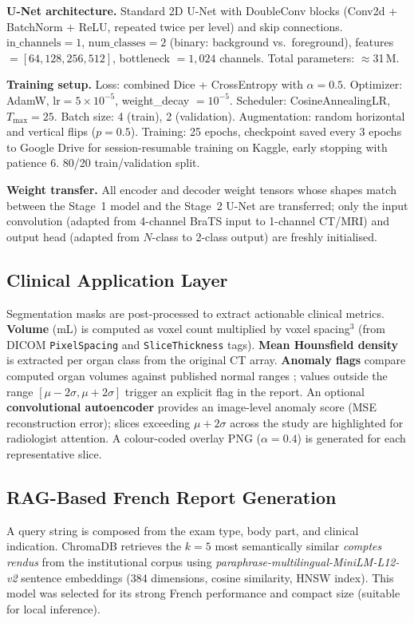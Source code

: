 \documentclass[conference]{IEEEtran}
\begin{document}
\textbf{U-Net architecture.}
Standard 2D U-Net with DoubleConv blocks (Conv2d + BatchNorm + ReLU, repeated
twice per level) and skip connections.
$\text{in\_channels}=1$, $\text{num\_classes}=2$ (binary: background
vs.\ foreground), features $= [64, 128, 256, 512]$,
bottleneck $= 1{,}024$ channels. Total parameters: $\approx$31\,M.

\textbf{Training setup.}
Loss: combined Dice + CrossEntropy with $\alpha=0.5$.
Optimizer: AdamW, $\text{lr}=5\!\times\!10^{-5}$,
weight\_decay $=10^{-5}$.
Scheduler: CosineAnnealingLR, $T_{\max}=25$.
Batch size: 4 (train), 2 (validation).
Augmentation: random horizontal and vertical flips ($p=0.5$).
Training: 25 epochs, checkpoint saved every 3 epochs to Google Drive for
session-resumable training on Kaggle, early stopping with patience 6.
80/20 train/validation split.

\textbf{Weight transfer.}
All encoder and decoder weight tensors whose shapes match between the Stage~1
model and the Stage~2 U-Net are transferred; only the input convolution
(adapted from 4-channel BraTS input to 1-channel CT/MRI) and output head
(adapted from $N$-class to 2-class output) are freshly initialised.

\subsection{Clinical Application Layer}

Segmentation masks are post-processed to extract actionable clinical metrics.
\textbf{Volume} (mL) is computed as voxel count multiplied by voxel
spacing$^3$ (from DICOM \texttt{PixelSpacing} and \texttt{SliceThickness} tags).
\textbf{Mean Hounsfield density} is extracted per organ class from the original
CT array. \textbf{Anomaly flags} compare computed organ volumes against
published normal ranges \cite{molina2021}; values outside the range
$[\mu - 2\sigma, \mu + 2\sigma]$ trigger an explicit flag in the report.
An optional \textbf{convolutional autoencoder} provides an image-level anomaly
score (MSE reconstruction error); slices exceeding $\mu + 2\sigma$ across the
study are highlighted for radiologist attention. A colour-coded overlay PNG
($\alpha = 0.4$) is generated for each representative slice.

\subsection{RAG-Based French Report Generation}

A query string is composed from the exam type, body part, and clinical
indication. ChromaDB retrieves the $k=5$ most semantically similar
\textit{comptes rendus} from the institutional corpus using
\textit{paraphrase-multilingual-MiniLM-L12-v2} sentence embeddings
(384 dimensions, cosine similarity, HNSW index). This model was selected for
its strong French performance and compact size (suitable for local inference).
\end{document}
